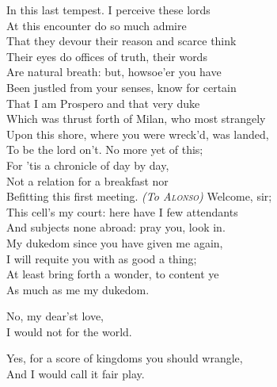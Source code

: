 \begin{verse_speech}[Prospero] 
In this last tempest. I perceive these lords\\
At this encounter do so much admire\\
That they devour their reason and scarce think\\
Their eyes do offices of truth, their words\\
Are natural breath: but, howsoe'er you have\\
Been justled from your senses, know for certain\\
That I am Prospero and that very duke\\
Which was thrust forth of Milan, who most strangely\\
Upon this shore, where you were wreck'd, was landed,\\
To be the lord on't. No more yet of this;\\
For 'tis a chronicle of day by day,\\
Not a relation for a breakfast nor\\
Befitting this first meeting. \textit{(To \textsc{Alonso})} Welcome, sir;\\
This cell's my court: here have I few attendants\\
And subjects none abroad: pray you, look in.\\
My dukedom since you have given me again,\\
I will requite you with as good a thing;\\
At least bring forth a wonder, to content ye\\
As much as me my dukedom.
\end{verse_speech}



\begin{verse_speech}[Ferdinand] 
No, my dear'st love,\\
I would not for the world.
\end{verse_speech}

\begin{verse_speech}[Miranda] 
Yes, for a score of kingdoms you should wrangle,\\
And I would call it fair play.
\end{verse_speech}

